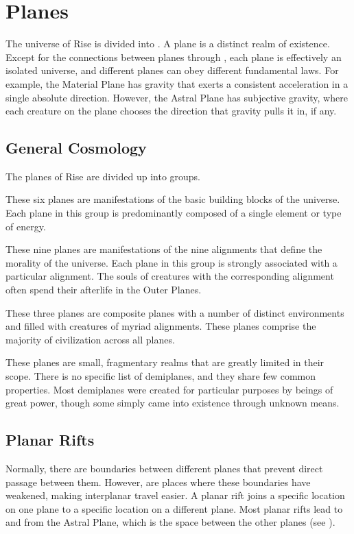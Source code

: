 \section{Planes}\label{Planes}
    The universe of Rise is divided into .
    A plane is a distinct realm of existence.
    Except for the connections between planes through , each plane is effectively an isolated universe, and different planes can obey different fundamental laws.
    For example, the Material Plane has gravity that exerts a consistent acceleration in a single absolute direction.
    However, the Astral Plane has subjective gravity, where each creature on the plane chooses the direction that gravity pulls it in, if any.

    \subsection{General Cosmology}
        The planes of Rise are divided up into groups.

         These six planes are manifestations of the basic building blocks of the universe.
        Each plane in this group is predominantly composed of a single element or type of energy.

         These nine planes are manifestations of the nine alignments that define the morality of the universe.
        Each plane in this group is strongly associated with a particular alignment.
        The souls of creatures with the corresponding alignment often spend their afterlife in the Outer Planes.

         These three planes are composite planes with a number of distinct environments and filled with creatures of myriad alignments.
        These planes comprise the majority of civilization across all planes.

         These planes are small, fragmentary realms that are greatly limited in their scope.
        There is no specific list of demiplanes, and they share few common properties.
        Most demiplanes were created for particular purposes by beings of great power, though some simply came into existence through unknown means.

    \subsection{Planar Rifts}
        Normally, there are boundaries between different planes that prevent direct passage between them.
        However,  are places where these boundaries have weakened, making interplanar travel easier.
        A planar rift joins a specific location on one plane to a specific location on a different plane.
        Most planar rifts lead to and from the Astral Plane, which is the space between the other planes (see ).


